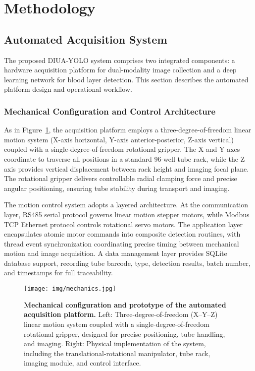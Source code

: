 \section{Methodology}
\label{sec:methodology}

\subsection{Automated Acquisition System}

The proposed DIUA-YOLO system comprises two integrated components: a hardware acquisition platform for dual-modality image collection and a deep learning network for blood layer detection. This section describes the automated platform design and operational workflow.

\subsubsection{Mechanical Configuration and Control Architecture} As in Figure~\ref{fig:mechanics}, the acquisition platform employs a three-degree-of-freedom linear motion system (X-axis horizontal, Y-axis anterior-posterior, Z-axis vertical) coupled with a single-degree-of-freedom rotational gripper. The X and Y axes coordinate to traverse all positions in a standard 96-well tube rack, while the Z axis provides vertical displacement between rack height and imaging focal plane. The rotational gripper delivers controllable radial clamping force and precise angular positioning, ensuring tube stability during transport and imaging.

The motion control system adopts a layered architecture. At the communication layer, RS485 serial protocol governs linear motion stepper motors, while Modbus TCP Ethernet protocol controls rotational servo motors. The application layer encapsulates atomic motor commands into composite detection routines, with thread event synchronization coordinating precise timing between mechanical motion and image acquisition. A data management layer provides SQLite database support, recording tube barcode, type, detection results, batch number, and timestamps for full traceability.

\begin{figure}[!t]
\centerline{\texttt{[image: img/mechanics.jpg]}}
\caption{\textbf{Mechanical configuration and prototype of the automated acquisition platform.} 
Left: Three-degree-of-freedom (X–Y–Z) linear motion system coupled with a single-degree-of-freedom rotational gripper, designed for precise positioning, tube handling, and imaging. 
Right: Physical implementation of the system, including the translational-rotational manipulator, tube rack, imaging module, and control interface.}
\label{fig:mechanics}
\end{figure}

